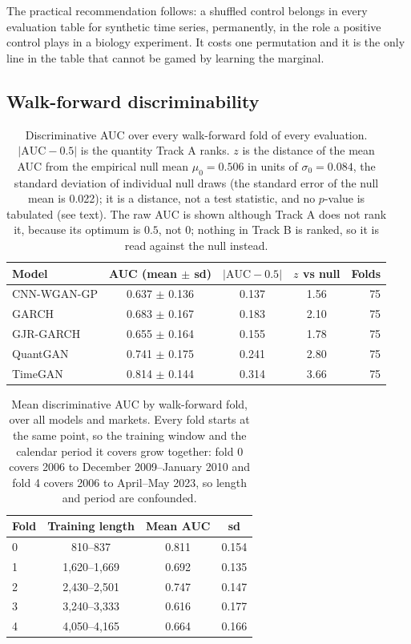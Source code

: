 \documentclass[11pt,a4paper]{article}
\makeatletter
\DeclareRobustCommand{\_}{\ifmmode\nfss@text{\textunderscore}\else\textunderscore\allowbreak\fi}
\makeatother
\begin{document}
The practical recommendation follows: a shuffled control belongs in every evaluation table for synthetic time series, permanently, in the role a positive control plays in a biology experiment. It costs one permutation and it is the only line in the table that cannot be gamed by learning the marginal.

\subsection{Walk-forward discriminability}
\label{sec:walkforward}

\begin{table}[htbp]
\centering
\caption{Discriminative AUC over every walk-forward fold of every evaluation. $|\mathrm{AUC}-0.5|$ is the quantity Track A ranks. $z$ is the distance of the mean AUC from the empirical null mean $\mu_0=0.506$ in units of $\sigma_0=0.084$, the standard deviation of individual null draws (the standard error of the null mean is 0.022); it is a distance, not a test statistic, and no $p$-value is tabulated (see text). The raw AUC is shown although Track A does not rank it, because its optimum is $0.5$, not $0$; nothing in Track B is ranked, so it is read against the null instead.}
\label{tab:auc}
\begin{tabular}{@{}lcccr@{}}
\toprule
Model & AUC (mean $\pm$ sd) & $|\mathrm{AUC}-0.5|$ & $z$ vs null & Folds \\
\midrule
CNN-WGAN-GP & 0.637 $\pm$ 0.136 & 0.137 & 1.56 & 75 \\
GARCH & 0.683 $\pm$ 0.167 & 0.183 & 2.10 & 75 \\
GJR-GARCH & 0.655 $\pm$ 0.164 & 0.155 & 1.78 & 75 \\
QuantGAN & 0.741 $\pm$ 0.175 & 0.241 & 2.80 & 75 \\
TimeGAN & 0.814 $\pm$ 0.144 & 0.314 & 3.66 & 75 \\
\bottomrule
\end{tabular}
\end{table}

\begin{table}[htbp]
\centering
\caption{Mean discriminative AUC by walk-forward fold, over all models and markets. Every fold starts at the same point, so the training window and the calendar period it covers grow together: fold 0 covers 2006 to December 2009--January 2010 and fold 4 covers 2006 to April--May 2023, so length and period are confounded.}
\label{tab:folds}
\begin{tabular}{@{}lccc@{}}
\toprule
Fold & Training length & Mean AUC & sd \\
\midrule
0 & 810--837 & 0.811 & 0.154 \\
1 & 1,620--1,669 & 0.692 & 0.135 \\
2 & 2,430--2,501 & 0.747 & 0.147 \\
3 & 3,240--3,333 & 0.616 & 0.177 \\
4 & 4,050--4,165 & 0.664 & 0.166 \\
\bottomrule
\end{tabular}
\end{table}
\end{document}

